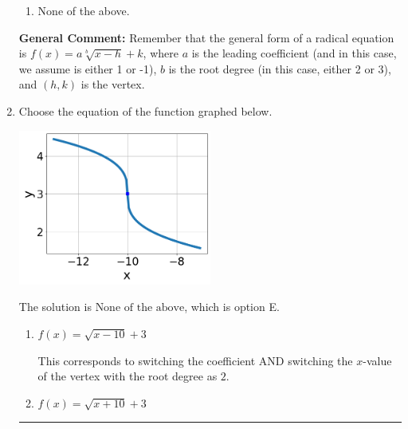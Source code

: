 \documentclass{extbook}[14pt]
\newcommand{\litem}[1]{\item #1

\rule{\textwidth}{0.4pt}}
\begin{document}
\begin{enumerate}
{\begin{enumerate}[label=\Alph*.]
\item None of the above.\end{enumerate}
\textbf{General Comment:} Remember that the general form of a radical equation is $ f(x) = a \sqrt[b]{x - h} + k $, where $a$ is the leading coefficient (and in this case, we assume is either 1 or -1), $b$ is the root degree (in this case, either 2 or 3), and $(h, k)$ is the vertex.
}
\litem{
Choose the equation of the function graphed below.

\begin{center}
    \includegraphics[width=0.5\textwidth]{../Figures/radicalGraphToEquationCopyC.png}
\end{center}


The solution is \( \text{None of the above} \), which is option E.\begin{enumerate}[label=\Alph*.]
\item \( f(x) = \sqrt{x - 10} + 3 \)

This corresponds to switching the coefficient AND switching the $x$-value of the vertex with the root degree as $2$.
\item \( f(x) = \sqrt{x + 10} + 3 \)


\end{enumerate}}
\end{enumerate}
\end{document}
